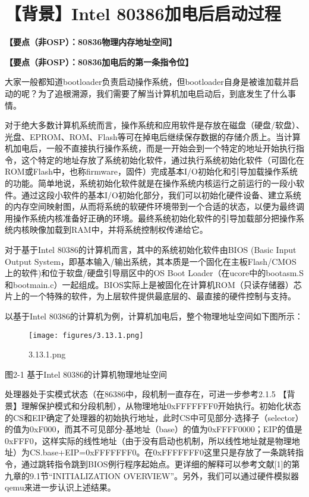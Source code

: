 \section{【背景】Intel
80386加电后启动过程}\label{ux80ccux666fintel-80386ux52a0ux7535ux540eux542fux52a8ux8fc7ux7a0b}

\textbf{【要点（非OSP）：80836物理内存地址空间】}

\textbf{【要点（非OSP）：80836加电后的第一条指令位】}

大家一般都知道bootloader负责启动操作系统，但bootloader自身是被谁加载并启动的呢？为了追根溯源，我们需要了解当计算机加电启动后，到底发生了什么事情。

对于绝大多数计算机系统而言，操作系统和应用软件是存放在磁盘（硬盘/软盘）、光盘、EPROM、ROM、Flash等可在掉电后继续保存数据的存储介质上。当计算机加电后，一般不直接执行操作系统，而是一开始会到一个特定的地址开始执行指令，这个特定的地址存放了系统初始化软件，通过执行系统初始化软件（可固化在ROM或Flash中，也称firmware，固件）完成基本I/O初始化和引导加载操作系统的功能。简单地说，系统初始化软件就是在操作系统内核运行之前运行的一段小软件。通过这段小软件的基本I/O初始化部分，我们可以初始化硬件设备、建立系统的内存空间映射图，从而将系统的软硬件环境带到一个合适的状态，以便为最终调用操作系统内核准备好正确的环境。最终系统初始化软件的引导加载部分把操作系统内核映像加载到RAM中，并将系统控制权传递给它。

对于基于Intel 80386的计算机而言，其中的系统初始化软件由BIOS (Basic Input
Output
System，即基本输入/输出系统，其本质是一个固化在主板Flash/CMOS上的软件)和位于软盘/硬盘引导扇区中的OS
Boot
Loader（在ucore中的bootasm.S和bootmain.c）一起组成。BIOS实际上是被固化在计算机ROM（只读存储器）芯片上的一个特殊的软件，为上层软件提供最底层的、最直接的硬件控制与支持。

以基于Intel
80386的计算机为例，计算机加电后，整个物理地址空间如下图所示：

\begin{figure}[htbp]
\centering
\texttt{[image: figures/3.13.1.png]}
\caption{3.13.1.png}
\end{figure}

图2-1 基于Intel 80386的计算机物理地址空间

处理器处于实模式状态（在86386中，段机制一直存在，可进一步参考2.1.5
【背景】理解保护模式和分段机制），从物理地址0xFFFFFFF0开始执行。初始化状态的CS和EIP确定了处理器的初始执行地址，此时CS中可见部分-选择子（selector）的值为0xF000，而其不可见部分-基地址（base）的值为0xFFFF0000；EIP的值是0xFFF0，这样实际的线性地址（由于没有启动也机制，所以线性地址就是物理地址）为CS.base+EIP=0xFFFFFFF0。在0xFFFFFFF0这里只是存放了一条跳转指令，通过跳转指令跳到BIOS例行程序起始点。更详细的解释可以参考文献{[}1{]}的第九章的9.1节``INITIALIZATION
OVERVIEW''。另外，我们可以通过硬件模拟器qemu来进一步认识上述结果。

